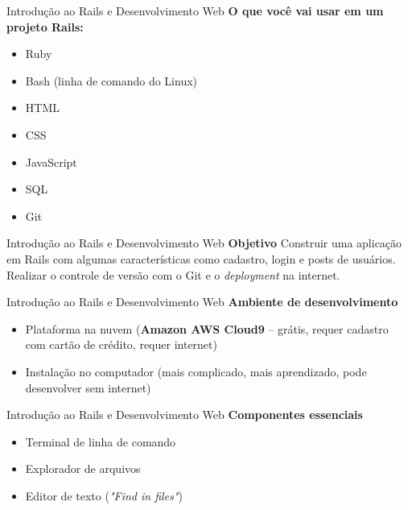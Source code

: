 \documentclass[10pt]{beamer}
\begin{document}
\begin{frame}{Introdução ao Rails e Desenvolvimento Web}
  \huge
  \textbf{O que você vai usar em um projeto Rails:}
  \vfill
  \large
  \begin{itemize}
    \item Ruby
    \item Bash (linha de comando do Linux)
    \item HTML
    \item CSS
    \item JavaScript
    \item SQL
    \item Git
  \end{itemize}
\end{frame}

\begin{frame}{Introdução ao Rails e Desenvolvimento Web}
  \huge
  \textbf{Objetivo}
  \vfill
  \Large
  Construir uma aplicação em Rails com algumas características como cadastro, login e posts de usuários. Realizar o controle de versão com o Git e o \textit{deployment} na internet.
\end{frame}

\begin{frame}{Introdução ao Rails e Desenvolvimento Web}
  \huge
  \textbf{Ambiente de desenvolvimento}
  \vfill
  \Large
  \begin{itemize}
    \item Plataforma na nuvem (\textbf{Amazon AWS Cloud9} -- grátis, requer cadastro com cartão de crédito, requer internet)
    \item Instalação no computador (mais complicado, mais aprendizado, pode desenvolver sem internet)
  \end{itemize}
\end{frame}

\begin{frame}{Introdução ao Rails e Desenvolvimento Web}
  \huge
  \textbf{Componentes essenciais}
  \vfill
  \LARGE
  \begin{itemize}
    \item Terminal de linha de comando
    \item Explorador de arquivos
    \item Editor de texto (\textit{"Find in files"})
  \end{itemize}
\end{frame}
\end{document}

